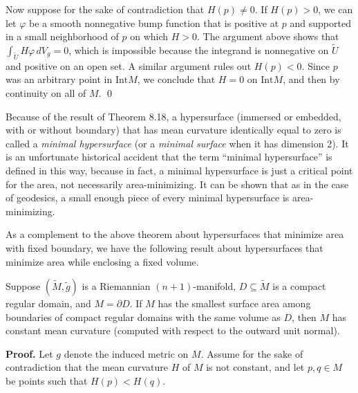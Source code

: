 Now suppose for the sake of contradiction that $H(p) \neq 0$. If $H(p)>0$, we can let $\varphi$ be a smooth nonnegative bump function that is positive at $p$ and supported in a small neighborhood of $p$ on which $H > 0$. The argument above shows that $\int_{\tilde{U}} H\varphi \, dV_g = 0$, which is impossible because the integrand is nonnegative on $\tilde{U}$ and positive on an open set. A similar argument rules out $H(p) < 0$. Since $p$ was an arbitrary point in $\text{Int} M$, we conclude that $H = 0$ on $\text{Int}M$, and then by continuity on all of $M$. \qed

Because of the result of Theorem 8.18, a hypersurface (immersed or embedded, with or without boundary) that has mean curvature identically equal to zero is called a \emph{minimal hypersurface} (or a \emph{minimal surface} when it has dimension 2). It is an unfortunate historical accident that the term ``minimal hypersurface'' is defined in this way, because in fact, a minimal hypersurface is just a critical point for the area, not necessarily area-minimizing. It can be shown that as in the case of geodesics, a small enough piece of every minimal hypersurface is area-minimizing.

As a complement to the above theorem about hypersurfaces that minimize area with fixed boundary, we have the following result about hypersurfaces that minimize area while enclosing a fixed volume.

\begin{theorem}
\label{thm:constant-mean-curvature-isoperimetric}

Suppose $(\tilde{M},\tilde{g})$ is a Riemannian $(n+1)$-manifold, $D \subseteq \tilde{M}$ is a compact regular domain, and $M = \partial D$. If $M$ has the smallest surface area among boundaries of compact regular domains with the same volume as $D$, then $M$ has constant mean curvature (computed with respect to the outward unit normal).
\end{theorem}

\textbf{Proof.} Let $g$ denote the induced metric on $M$. Assume for the sake of contradiction that the mean curvature $H$ of $M$ is not constant, and let $p,q \in M$ be points such that $H(p) < H(q)$.

